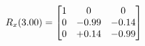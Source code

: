 \documentclass[preview]{standalone}
\begin{document}
\begin{align*}
\special{dvisvgm:raw <g id='unique000'>}R_{x}(3.00) = \begin{bmatrix}1 & 0 & 0 \\0 & -0.99 & -0.14 \\0 & +0.14 & -0.99\end{bmatrix}\special{dvisvgm:raw </g>}
\end{align*}
\end{document}
